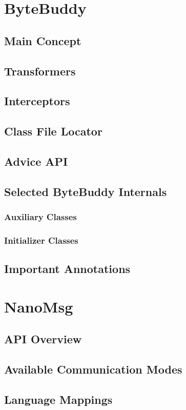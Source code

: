 \section{ByteBuddy}
\subsection{Main Concept}
\subsection{Transformers}
\subsection{Interceptors}
\subsection{Class File Locator}
\subsection{Advice API}
\subsection{Selected ByteBuddy Internals}
\subsubsection{Auxiliary Classes}
\subsubsection{Initializer Classes}
\subsection{Important Annotations}
\section{NanoMsg}
\subsection{API Overview}
\subsection{Available Communication Modes}
\subsection{Language Mappings}
